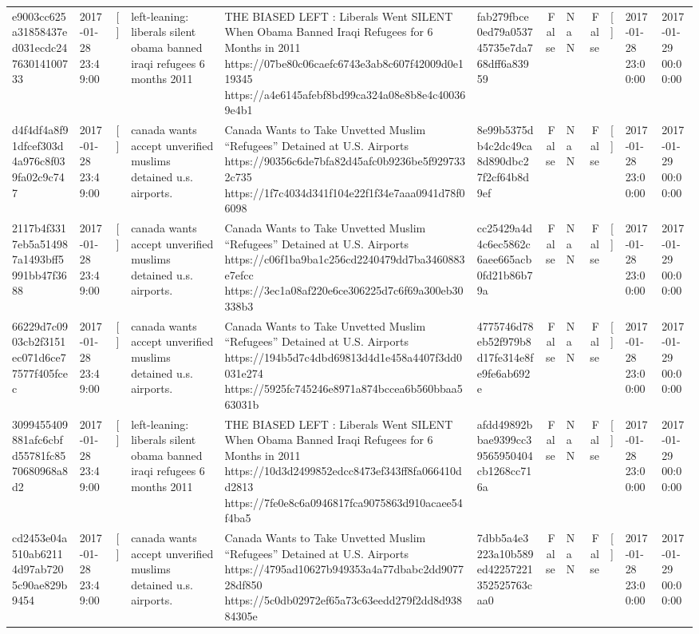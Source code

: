 \begin{tabular}{llllllrlrlll}
e9003cc625a31858437ed031ecdc24763014100733 & 2017-01-28 23:49:00 & [] & left-leaning: liberals silent obama banned iraqi refugees 6 months 2011 & THE BIASED LEFT : Liberals Went SILENT When Obama Banned Iraqi Refugees for 6 Months in 2011 https://07be80c06caefc6743e3ab8c607f42009d0e119345 https://a4e6145afebf8bd99ca324a08e8b8e4c400369e4b1 & fab279fbce0ed79a053745735e7da768dff6a83959 & False & NaN & False & [] & 2017-01-28 23:00:00 & 2017-01-29 00:00:00 \\
d4f4df4a8f91dfcef303d4a976c8f039fa02c9c747 & 2017-01-28 23:49:00 & [] & canada wants accept unverified muslims detained u.s. airports. & Canada Wants to Take Unvetted Muslim “Refugees” Detained at U.S. Airports https://90356c6de7bfa82d45afc0b9236be5f9297332c735 https://1f7c4034d341f104e22f1f34e7aaa0941d78f06098 & 8e99b5375db4c2dc49ca8d890dbc27f2cf64b8d9ef & False & NaN & False & [] & 2017-01-28 23:00:00 & 2017-01-29 00:00:00 \\
2117b4f3317eb5a514987a1493bff5991bb47f3688 & 2017-01-28 23:49:00 & [] & canada wants accept unverified muslims detained u.s. airports. & Canada Wants to Take Unvetted Muslim “Refugees” Detained at U.S. Airports https://c06f1ba9ba1c256cd2240479dd7ba3460883e7efcc https://3ec1a08af220e6ce306225d7c6f69a300eb30338b3 & cc25429a4d4c6ec5862c6aee665acb0fd21b86b79a & False & NaN & False & [] & 2017-01-28 23:00:00 & 2017-01-29 00:00:00 \\
66229d7c0903cb2f3151ec071d6ce77577f405fcec & 2017-01-28 23:49:00 & [] & canada wants accept unverified muslims detained u.s. airports. & Canada Wants to Take Unvetted Muslim “Refugees” Detained at U.S. Airports https://194b5d7c4dbd69813d4d1e458a4407f3dd0031e274 https://5925fc745246e8971a874bccea6b560bbaa563031b & 4775746d78eb52f979b8d17fe314e8fe9fe6ab692e & False & NaN & False & [] & 2017-01-28 23:00:00 & 2017-01-29 00:00:00 \\
3099455409881afc6cbfd55781fc8570680968a8d2 & 2017-01-28 23:49:00 & [] & left-leaning: liberals silent obama banned iraqi refugees 6 months 2011 & THE BIASED LEFT : Liberals Went SILENT When Obama Banned Iraqi Refugees for 6 Months in 2011 https://10d3d2499852edcc8473ef343ff8fa066410dd2813 https://7fe0e8c6a0946817fca9075863d910acaee54f4ba5 & afdd49892bbae9399cc39565950404cb1268cc716a & False & NaN & False & [] & 2017-01-28 23:00:00 & 2017-01-29 00:00:00 \\
cd2453e04a510ab62114d97ab7205c90ae829b9454 & 2017-01-28 23:49:00 & [] & canada wants accept unverified muslims detained u.s. airports. & Canada Wants to Take Unvetted Muslim “Refugees” Detained at U.S. Airports https://4795ad10627b949353a4a77dbabc2dd907728df850 https://5c0db02972ef65a73c63eedd279f2dd8d93884305e & 7dbb5a4e3223a10b589ed42257221352525763caa0 & False & NaN & False & [] & 2017-01-28 23:00:00 & 2017-01-29 00:00:00 \\

\end{tabular}
